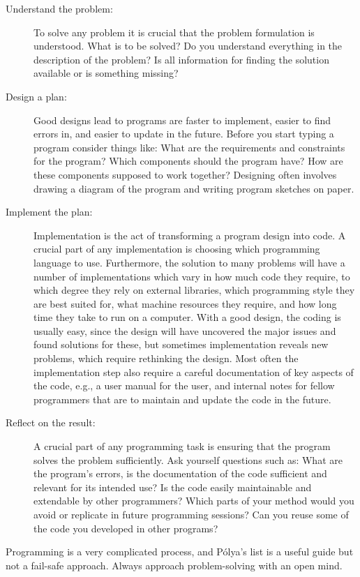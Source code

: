 \begin{description}
\item[Understand the problem:] To solve any problem it is crucial that the problem formulation is understood. What is to be solved? Do you understand everything in the description of the problem? Is all information for finding the solution available or is something missing?
\item[Design a plan:] Good designs lead to programs are faster to implement, easier to find errors in, and easier to update in the future. Before you start typing a program consider things like: What are the requirements and constraints for the program? Which components should the program have? How are these components supposed to work together? Designing often involves drawing a diagram of the program and writing program sketches on paper.
\item[Implement the plan:] Implementation is the act of transforming a program design into code. A crucial part of any implementation is choosing which programming language to use. Furthermore, the solution to many problems will have a number of implementations which vary in how much code they require, to which degree they rely on external libraries, which programming style they are best suited for, what machine resources they require, and how long time they take to run on a computer.  With a good design, the coding is usually easy, since the design will have uncovered the major issues and found solutions for these, but sometimes implementation reveals new problems, which require rethinking the design. Most often the implementation step also require a careful documentation of key aspects of the code, e.g., a user manual for the user, and internal notes for fellow programmers that are to maintain and update the code in the future.
\item[Reflect on the result:] A crucial part of any programming task is ensuring that the program solves the problem sufficiently. Ask yourself questions such as: What are the program's errors, is the documentation of the code sufficient and relevant for its intended use? Is the code easily maintainable and extendable by other programmers? Which parts of your method would you avoid or replicate in future programming sessions? Can you reuse some of the code you developed in other programs?
\end{description}
Programming is a very complicated process, and Pólya's list is a useful guide but not a fail-safe approach. Always approach problem-solving with an open mind.

